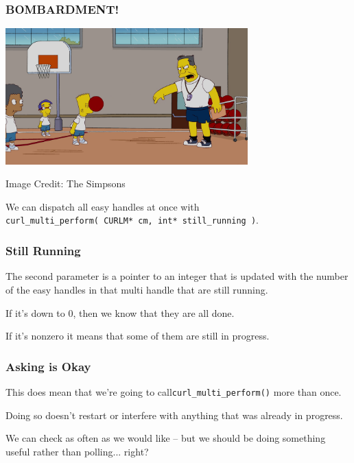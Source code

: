 \begin{frame}
	\frametitle{BOMBARDMENT!}
	\begin{center}
		\includegraphics[width=0.7\textwidth]{images/Bombardment.png}
	\end{center}
	\hfill Image Credit: The Simpsons

	We can dispatch all easy handles at once with\\
	\texttt{curl\_multi\_perform( CURLM* cm, int* still\_running )}.


\end{frame}

\begin{frame}
	\frametitle{Still Running}

	The second parameter is a pointer to an integer that is updated with the number of the easy handles in that multi handle that are still running.

	If it's down to 0, then we know that they are all done.

	If it's nonzero it means that some of them are still in progress.


\end{frame}

\begin{frame}
	\frametitle{Asking is Okay}

	This does mean that we're going to call\texttt{curl\_multi\_perform()} more than once.

	Doing so doesn't restart or interfere with anything that was already in progress.

	We can check as often as we would like -- but we should be doing something useful rather than polling... right?

\end{frame}


